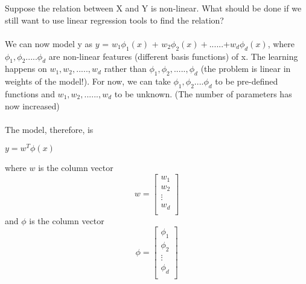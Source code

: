 \documentclass[12pt]{article}
\begin{document}
Suppose the relation between X and Y is non-linear. What should be done if we still want to use linear regression tools to find the relation?\\
\\
We can now model y as $y$ = $w_1\phi_1(x)$ + $w_2\phi_2(x)+$......+$w_d\phi_d(x)$, where $\phi_1, \phi_2.....\phi_d$ are non-linear features (different basis functions) of x. The learning happens on $w_1, w_2,.....,w_d$ rather than $\phi_1, \phi_2,.....,\phi_d$ (the problem is linear in weights of the model!). For now, we can take $\phi_1, \phi_2....\phi_d$ to be pre-defined functions and $w_1, w_2,......,w_d$ to be unknown. (The number of parameters has now increased)\\
\\
The model, therefore, is\\
\begin{center}
    $y = w^T\phi(x)$
\end{center}
where $w$ is the column vector 
$$w =     \begin{bmatrix}
  w_1 \\
  w_2 \\
  \vdots \\
  w_d \\
 \end{bmatrix}
$$ 
and $\phi$ is the column vector
$$\phi =     \begin{bmatrix}
  \phi_1 \\
  \phi_2 \\
  \vdots \\
  \phi_d \\
 \end{bmatrix}
$$ 
\end{document}

